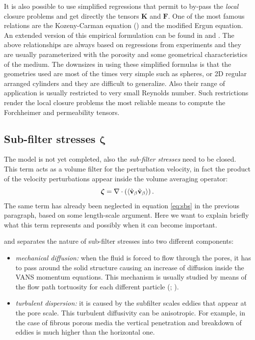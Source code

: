 It is also possible to use simplified regressions that permit to by-pass the \textit{local} closure problems and get directly the tensors $\mathbf{K}$ and $\mathbf{F}$.
One of the most famous relations are the Kozeny-Carman equation (\citet{kozeny}) and the modified Ergun equation.
An extended version of this empirical formulation can be found in \citet{zampogna2016fluid} and \citet{yazdchi2012towards}.
The above relationships are always based on regressions from experiments and they are usually parameterized with the porosity and some geometrical characteristics of the medium. The downsizes in using these simplified formulas is that the geometries used are most of the times very simple such as spheres, or 2D regular arranged cylinders and they are difficult to generalize. Also their range of application is usually restricted to very small Reynolds number. Such restrictions render the local closure problems the most reliable means to compute the Forchheimer and permeability tensors.

\subsection{Sub-filter stresses $\boldsymbol{\zeta}$}

The model is not yet completed, also the \textit{sub-filter stresses} need to be closed. This term acts as a volume filter for the perturbation velocity, in fact the product of the velocity perturbations appear inside the volume averaging operator:
$$\boldsymbol{\zeta} = \nabla \cdot \left({\left< \tilde{\textbf{v}}_{\beta} \tilde{\textbf{v}}_{\beta} \right>}\right).$$
The same term has already been neglected in equation \eqref{eq:sbs} in the previous paragraph, based on some length-scale argument.  Here we want to explain briefly what this term represents and possibly when it can become important.

\citet{breugem2006influence} and \citet{nepf1999drag} separates the nature of sub-filter stresses into two different components:
\begin{itemize}
	\item \textit{mechanical diffusion:} when the fluid is forced to flow through the pores, it has to pass around the solid structure causing an increase of diffusion inside the VANS momentum equations. This mechanism is usually studied by means of the flow path tortuosity for each different particle (\citet{duda2011hydraulic}; \citet{sivanesapillai2014transition}).
	\item \textit{turbulent dispersion:} it is caused by the subfilter scales eddies that appear at the pore scale. This turbulent diffusivity can be anisotropic. For example, in the case of fibrous porous media the vertical penetration and breakdown of eddies is much higher than the horizontal one.
\end{itemize}

